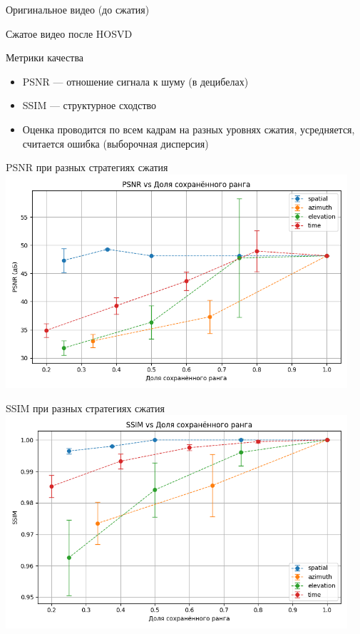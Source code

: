 \documentclass{beamer}
\begin{document}
\begin{frame}{Оригинальное видео (до сжатия)}
    \centering
\end{frame}

\begin{frame}{Сжатое видео после HOSVD}
    \centering
\end{frame}
    
    

\begin{frame}{Метрики качества}
\begin{itemize}
  \item PSNR — отношение сигнала к шуму (в децибелах)
  \item SSIM — структурное сходство
  \item Оценка проводится по всем кадрам на разных уровнях сжатия, усредняется, считается ошибка (выборочная дисперсия)
\end{itemize}
\end{frame}

\begin{frame}{PSNR при разных стратегиях сжатия}
\centering
\includegraphics[width=0.95\textwidth]{psnr_all.png}
\end{frame}

\begin{frame}{SSIM при разных стратегиях сжатия}
\centering
\includegraphics[width=0.95\textwidth]{ssim_all.png}
\end{frame}
\end{document}
